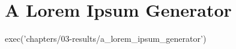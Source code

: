 \section{A Lorem Ipsum Generator}
\label{sec:a-lorem-ipsum-generator}
{ { exec('chapters/03-results/a_lorem_ipsum_generator') } }
